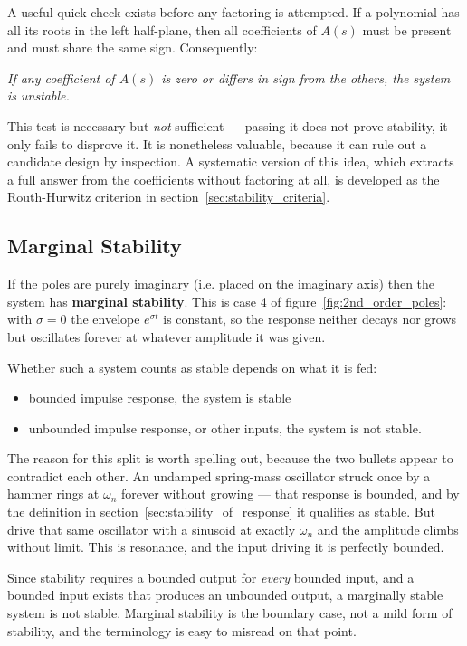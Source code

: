 \documentclass[12pt,letter]{article}
\begin{document}
A useful quick check exists before any factoring is attempted. If a polynomial has all its roots in the left half-plane, then all coefficients of $A(s)$ must be present and must share the same sign. Consequently:

\begin{center}
	\textit{If any coefficient of $A(s)$ is zero or differs in sign from the others, the system is unstable.}
\end{center}

\noindent This test is necessary but \emph{not} sufficient --- passing it does not prove stability, it only fails to disprove it. It is nonetheless valuable, because it can rule out a candidate design by inspection. A systematic version of this idea, which extracts a full answer from the coefficients without factoring at all, is developed as the Routh-Hurwitz criterion in section~\ref{sec:stability_criteria}.


\subsection{Marginal Stability}
\label{sec:marginal_stability}

If the poles are purely imaginary (i.e. placed on the imaginary axis) then the system has \textbf{marginal stability}. This is case 4 of figure~\ref{fig:2nd_order_poles}: with $\sigma = 0$ the envelope $e^{\sigma t}$ is constant, so the response neither decays nor grows but oscillates forever at whatever amplitude it was given.

Whether such a system counts as stable depends on what it is fed:
\begin{itemize}
	\item bounded impulse response, the system is stable
	\item unbounded impulse response, or other inputs, the system is not stable.
\end{itemize}

\noindent The reason for this split is worth spelling out, because the two bullets appear to contradict each other. An undamped spring-mass oscillator struck once by a hammer rings at $\omega_n$ forever without growing --- that response is bounded, and by the definition in section~\ref{sec:stability_of_response} it qualifies as stable. But drive that same oscillator with a sinusoid at exactly $\omega_n$ and the amplitude climbs without limit. This is resonance, and the input driving it is perfectly bounded.

Since stability requires a bounded output for \emph{every} bounded input, and a bounded input exists that produces an unbounded output, a marginally stable system is not stable. Marginal stability is the boundary case, not a mild form of stability, and the terminology is easy to misread on that point.
\end{document}
